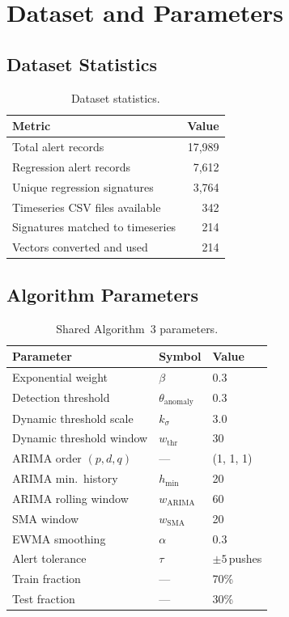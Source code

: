 \documentclass[11pt,a4paper]{article}
\begin{document}
\section{Dataset and Parameters}

\subsection{Dataset Statistics}


\begin{table}[H]
\centering
\caption{Dataset statistics.}
\label{tab:dataset}
\begin{tabular}{lr}
\toprule
Metric & Value \\
\midrule
Total alert records              & 17,989 \\
Regression alert records         & 7,612 \\
Unique regression signatures     & 3,764 \\
Timeseries CSV files available   & 342 \\
Signatures matched to timeseries & 214 \\
Vectors converted and used       & 214 \\
\bottomrule
\end{tabular}
\end{table}


\subsection{Algorithm Parameters}


\begin{table}[H]
\centering
\caption{Shared Algorithm~3 parameters.}
\label{tab:params}
\begin{tabular}{lll}
\toprule
Parameter & Symbol & Value \\
\midrule
Exponential weight      & $\beta$                            & 0.3 \\
Detection threshold     & $\theta_{\mathrm{anomaly}}$   & 0.3 \\
Dynamic threshold scale & $k_\sigma$                         & 3.0 \\
Dynamic threshold window & $w_{\mathrm{thr}}$            & 30 \\
ARIMA order $(p,d,q)$   & ---                                 & (1, 1, 1) \\
ARIMA min.\ history    & $h_{\min}$                       & 20 \\
ARIMA rolling window    & $w_{\mathrm{ARIMA}}$           & 60 \\
SMA window              & $w_{\mathrm{SMA}}$             & 20 \\
EWMA smoothing          & $\alpha$                           & 0.3 \\
Alert tolerance         & $\tau$                             & $\pm5$\,pushes \\
Train fraction          & ---                                 & 70\% \\
Test fraction           & ---                                 & 30\% \\
\bottomrule
\end{tabular}
\end{table}
\end{document}
